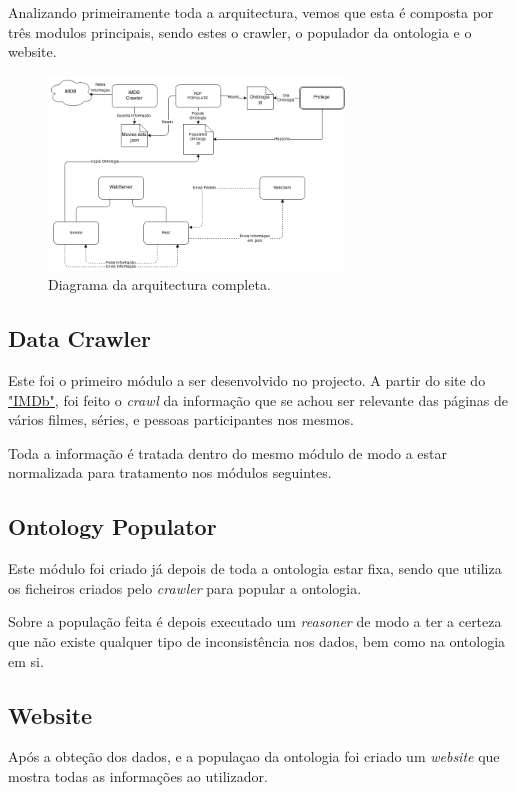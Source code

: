 \documentclass[a4paper]{article}
\begin{document}
Analizando primeiramente toda a arquitectura, vemos que esta é composta por três modulos principais, sendo estes o crawler, o populador da ontologia e o website.

\begin{figure}[h]
	\vspace{20pt}
	\begin{center}
		\includegraphics[width=0.7\textwidth]{imgs/ws.png}
	\end{center}
	\caption{Diagrama da arquitectura completa.}
\end{figure}

\subsection{Data Crawler}
\indent \indent Este foi o primeiro módulo a ser desenvolvido no projecto. A partir do site do \hyperref[www.imdb.com]{"IMDb"}, foi feito o \textit{crawl} da informação que se achou ser relevante das páginas de vários filmes, séries, e pessoas participantes nos mesmos.
 
Toda a informação é tratada dentro do mesmo módulo de modo a estar normalizada para tratamento nos módulos seguintes.

\subsection{Ontology Populator}
\indent \indent Este módulo foi criado já depois de toda a ontologia estar fixa, sendo que utiliza os ficheiros criados pelo \textit{crawler} para popular a ontologia.

Sobre a população feita é depois executado um \textit{reasoner} de modo a ter a certeza que não existe qualquer tipo de inconsistência nos dados, bem como na ontologia em si.

\subsection{Website}
\indent \indent Após a obteção dos dados, e a populaçao da ontologia foi criado um \textit{website} que mostra todas as informações ao utilizador.
\end{document}
